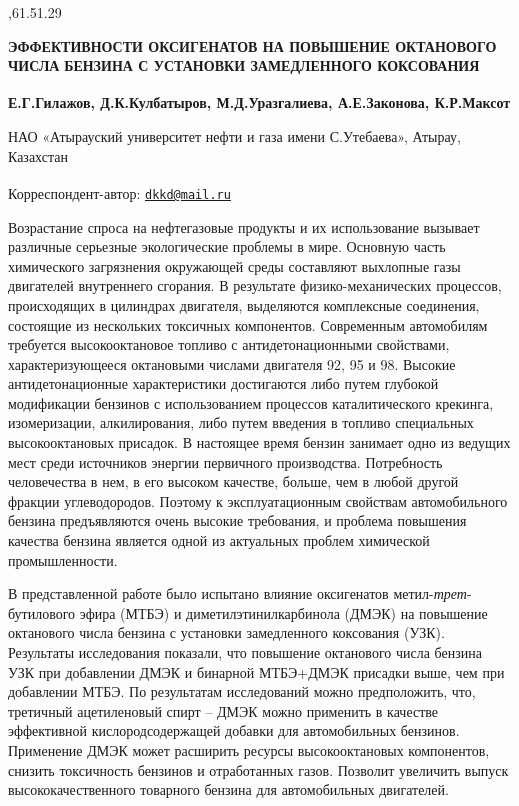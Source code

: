 ,61.51.29

{\bfseries ЭФФЕКТИВНОСТИ ОКСИГЕНАТОВ НА ПОВЫШЕНИЕ ОКТАНОВОГО ЧИСЛА}
{\bfseries БЕНЗИНА С УСТАНОВКИ ЗАМЕДЛЕННОГО КОКСОВАНИЯ}

{\bfseries Е.Г.Гилажов, Д.К.Кулбатыров\textsuperscript{\envelope }, М.Д.Уразгалиева,
А.Е.Законова, К.Р.Максот}

НАО «Атырауский университет нефти и газа имени С.Утебаева», Атырау,
Казахстан

{\bfseries \textsuperscript{\envelope }}Корреспондент-автор:
\href{mailto:dkkd@mail.ru}{\nolinkurl{dkkd@mail.ru}}

Возрастание спроса на нефтегазовые продукты и их использование вызывает
различные серьезные экологические проблемы в мире. Основную часть
химического загрязнения окружающей среды составляют выхлопные газы
двигателей внутреннего сгорания. В результате физико-механических
процессов, происходящих в цилиндрах двигателя, выделяются комплексные
соединения, состоящие из нескольких токсичных компонентов. Современным
автомобилям требуется высокооктановое топливо с антидетонационными
свойствами, характеризующееся октановыми числами двигателя 92, 95 и 98.
Высокие антидетонационные характеристики достигаются либо путем глубокой
модификации бензинов с использованием процессов каталитического
крекинга, изомеризации, алкилирования, либо путем введения в топливо
специальных высокооктановых присадок. В настоящее время бензин занимает
одно из ведущих мест среди источников энергии первичного производства.
Потребность человечества в нем, в его высоком качестве, больше, чем в
любой другой фракции углеводородов. Поэтому к эксплуатационным свойствам
автомобильного бензина предъявляются очень высокие требования, и
проблема повышения качества бензина является одной из актуальных проблем
химической промышленности.

В представленной работе было испытано влияние оксигенатов
метил-\emph{трет}-бутилового эфира (МТБЭ) и диметилэтинилкарбинола
(ДМЭК) на повышение октанового числа бензина с установки замедленного
коксования (УЗК). Результаты исследования показали, что повышение
октанового числа бензина УЗК при добавлении ДМЭК и бинарной МТБЭ+ДМЭК
присадки выше, чем при добавлении МТБЭ. По результатам исследований
можно предположить, что, третичный ацетиленовый спирт -- ДМЭК можно
применить в качестве эффективной кислородсодержащей добавки для
автомобильных бензинов. Применение ДМЭК может расширить ресурсы
высокооктановых компонентов, снизить токсичность бензинов и отработанных
газов. Позволит увеличить выпуск высококачественного товарного бензина
для автомобильных двигателей.

